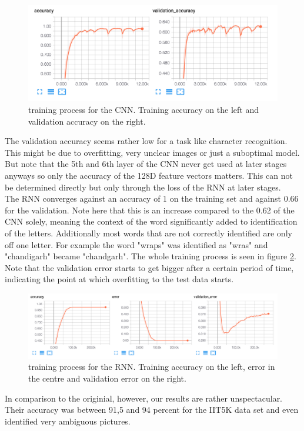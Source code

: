 \documentclass{utue} %
\begin{document}
\begin{figure}[h!]
	\centering
	\includegraphics[width=.9\columnwidth]{graphics/cnn_accuracy.png}
	\caption{\label{fig:cnn_accuracy} \footnotesize{training process for the CNN. Training accuracy on the left and validation accuracy on the right.}}
\end{figure}

The validation accuracy seems rather low for a task like character recognition. This might be due to overfitting, very unclear images or just a suboptimal model. But note that the 5th and 6th layer of the CNN never get used at later stages anyways so only the accuracy of the 128D feature vectors matters. This can not be determined directly but only through the loss of the RNN at later stages. \\
The RNN converges against an accuracy of 1 on the training set and against 0.66 for the validation. Note here that this is an increase compared to the 0.62 of the CNN solely, meaning the context of the word significantly added to identification of the letters. Additionally most words that are not correctly identified are only off one letter. For example the word "wraps" was identified as "wras" and "chandigarh" became "chandgarh".%
The whole training process is seen in figure \ref{fig:rnn_accuracy}. Note that the validation error starts to get bigger after a certain period of time, indicating the point at which overfitting to the test data starts. \\

\begin{figure}[h!]
	\centering
	\includegraphics[width=.9\columnwidth]{graphics/rnn_accuracy.png}
	\caption{\label{fig:rnn_accuracy} \footnotesize{training process for the RNN. Training accuracy on the left, error in the centre and validation error on the right.}}
\end{figure} 
In comparison to the originial, however, our results are rather unspectacular. Their accuracy was between 91,5 and 94 percent for the IIT5K data set and even identified very ambiguous pictures.
\end{document}
